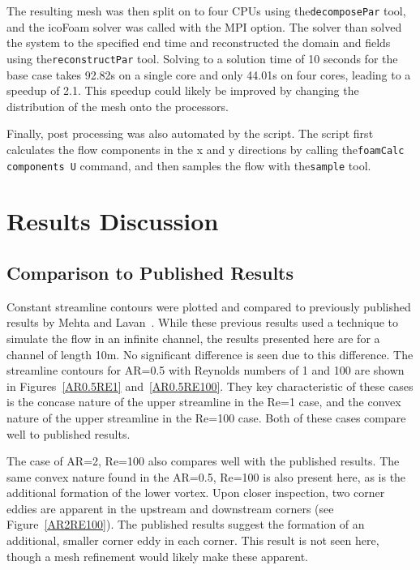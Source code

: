 \documentclass[twocolumn,10pt]{asme2ej}
\begin{document}
The resulting mesh was then split on to four CPUs using the\lstinline{decomposePar} tool, and the icoFoam solver was called with the MPI option. The solver than solved the system to the specified end time and reconstructed the domain and fields using the\lstinline{reconstructPar} tool. Solving to a solution time of 10 seconds for the base case takes 92.82s on a single core and only 44.01s on four cores, leading to a speedup of 2.1. This speedup could likely be improved by changing the distribution of the mesh onto the processors.

Finally, post processing was also automated by the script. The script first calculates the flow components in the x and y directions by calling the\lstinline{foamCalc components U} command, and then samples the flow with the\lstinline{sample} tool.

\section{Results Discussion}
\subsection{Comparison to Published Results}
Constant streamline contours were plotted and compared to previously published results by Mehta and Lavan~\cite{mehta1969flow}. While these previous results used a technique to simulate the flow in an infinite channel, the results presented here are for a channel of length 10m. No significant difference is seen due to this difference. The streamline contours for AR=0.5 with Reynolds numbers of 1 and 100 are shown in Figures~\ref{AR0.5RE1} and~\ref{AR0.5RE100}. They key characteristic of these cases is the concase nature of the upper streamline in the Re=1 case, and the convex nature of the upper streamline in the Re=100 case. Both of these cases compare well to published results.

The case of AR=2, Re=100 also compares well with the published results. The same convex nature found in the AR=0.5, Re=100 is also present here, as is the additional formation of the lower vortex. Upon closer inspection, two corner eddies are apparent in the upstream and downstream corners (see Figure~\ref{AR2RE100}). The published results suggest the formation of an additional, smaller corner eddy in each corner. This result is not seen here, though a mesh refinement would likely make these apparent.
\end{document}
